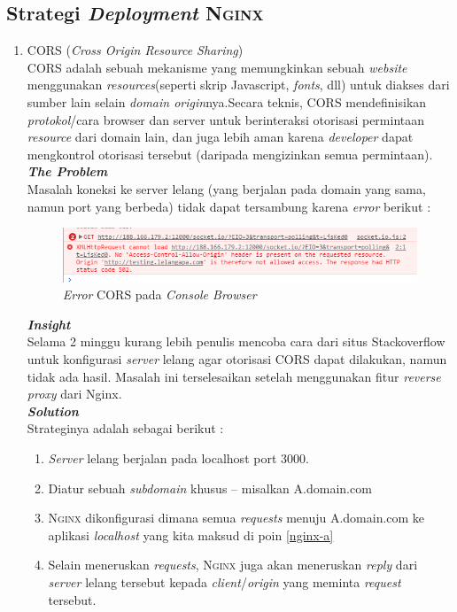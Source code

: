 \subsection{Strategi \textit{Deployment} \textsc{Nginx}}

\begin{enumerate}
	\item CORS (\textit{Cross Origin Resource Sharing})
	\\
	CORS adalah sebuah mekanisme yang memungkinkan  sebuah \textit{website} menggunakan \textit{resources}(seperti skrip Javascript, \textit{fonts}, dll) untuk diakses dari sumber lain selain \textit{domain origin}nya.Secara teknis, CORS mendefinisikan \textit{protokol}/cara browser dan server untuk berinteraksi otorisasi permintaan \textit{resource} dari domain lain, dan juga lebih aman karena \textit{developer} dapat mengkontrol otorisasi tersebut (daripada mengizinkan semua permintaan).\\
	
	\textbf{\textit{The Problem}} \\
	Masalah koneksi ke server lelang (yang berjalan pada domain yang sama, namun port yang berbeda) tidak dapat tersambung karena \textit{error} berikut :


	\begin{figure}[H]
		\centering
		\includegraphics[width=\textwidth]{images/bab4/pl/madafaka_cors.png}
		\caption{\textit{Error} CORS pada \textit{Console Browser}}
		\label{cors}
	\end{figure}
	
	
	\textbf{\textit{Insight}} \\
	Selama 2 minggu kurang lebih penulis mencoba cara dari situs Stackoverflow untuk konfigurasi \textit{server} lelang agar otorisasi CORS dapat dilakukan, namun tidak ada hasil. Masalah ini terselesaikan setelah menggunakan fitur \textit{reverse proxy} dari Nginx.\\
	
	\textbf{\textit{Solution}} \\
	\indentenum Strateginya adalah sebagai berikut :
	\begin{enumerate}
		\item \label{nginx-a} \textit{Server} lelang berjalan pada localhost port 3000.
		\item \label{nginx-b} Diatur sebuah \textit{subdomain} khusus -- misalkan A.domain.com
		\item \textsc{Nginx} dikonfigurasi dimana semua \textit{requests} menuju A.domain.com ke aplikasi \textit{localhost} yang kita maksud di poin \ref{nginx-a}
		\item Selain meneruskan \textit{requests}, \textsc{Nginx} juga akan meneruskan \textit{reply} dari \textit{server} lelang tersebut kepada \textit{client}/\textit{origin} yang meminta \textit{request} tersebut.				
	\end{enumerate}
\end{enumerate}